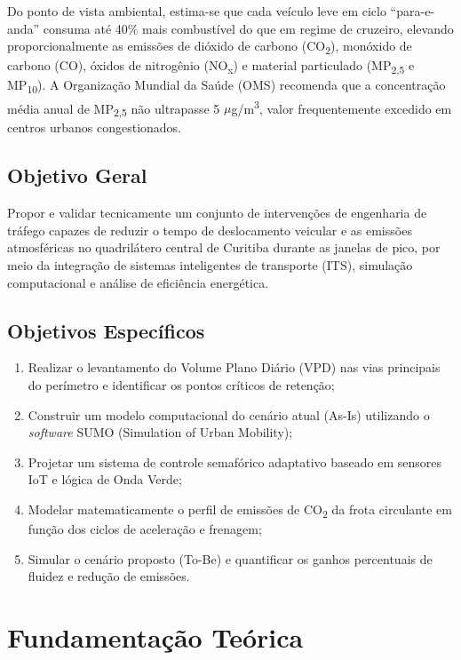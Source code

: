 \documentclass[12pt,a4paper,oneside]{abntex2}
\begin{document}
Do ponto de vista ambiental, estima-se que cada veículo leve em ciclo ``para-e-anda'' consuma até 40\% mais combustível do que em regime de cruzeiro, elevando proporcionalmente as emissões de dióxido de carbono (CO\textsubscript{2}), monóxido de carbono (CO), óxidos de nitrogênio (NO\textsubscript{x}) e material particulado (MP\textsubscript{2,5} e MP\textsubscript{10}). A Organização Mundial da Saúde (OMS) recomenda que a concentração média anual de MP\textsubscript{2,5} não ultrapasse 5 $\mu$g/m\textsuperscript{3}, valor frequentemente excedido em centros urbanos congestionados.

\section{Objetivo Geral}

Propor e validar tecnicamente um conjunto de intervenções de engenharia de tráfego capazes de reduzir o tempo de deslocamento veicular e as emissões atmosféricas no quadrilátero central de Curitiba durante as janelas de pico, por meio da integração de sistemas inteligentes de transporte (ITS), simulação computacional e análise de eficiência energética.

\section{Objetivos Específicos}

\begin{enumerate}[label=\alph*)]
  \item Realizar o levantamento do Volume Plano Diário (VPD) nas vias principais do perímetro e identificar os pontos críticos de retenção;
  \item Construir um modelo computacional do cenário atual (As-Is) utilizando o \textit{software} SUMO (Simulation of Urban Mobility);
  \item Projetar um sistema de controle semafórico adaptativo baseado em sensores IoT e lógica de Onda Verde;
  \item Modelar matematicamente o perfil de emissões de CO\textsubscript{2} da frota circulante em função dos ciclos de aceleração e frenagem;
  \item Simular o cenário proposto (To-Be) e quantificar os ganhos percentuais de fluidez e redução de emissões.
\end{enumerate}

\chapter{Fundamentação Teórica}
\end{document}
